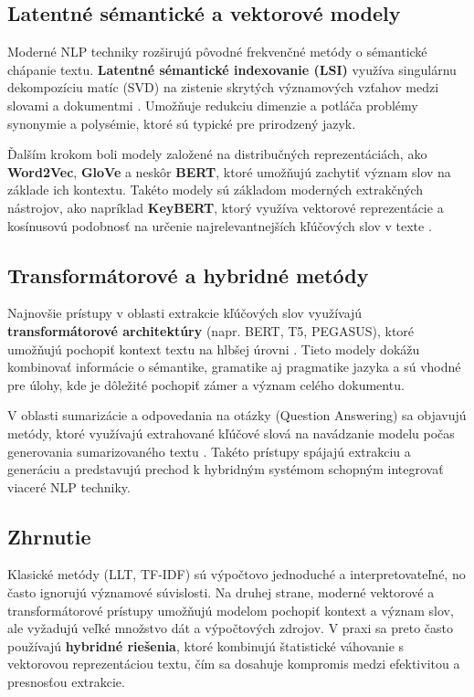 \documentclass[a4paper,12pt]{article}
\begin{document}
\subsection{Latentné sémantické a vektorové modely}

Moderné NLP techniky rozširujú pôvodné frekvenčné metódy o sémantické chápanie textu. \textbf{Latentné sémantické indexovanie (LSI)} využíva singulárnu dekompozíciu matíc (SVD) na zistenie skrytých významových vzťahov medzi slovami a dokumentmi \cite{deerwester1990indexing}. Umožňuje redukciu dimenzie a potláča problémy synonymie a polysémie, ktoré sú typické pre prirodzený jazyk.

Ďalším krokom boli modely založené na distribučných reprezentáciách, ako \textbf{Word2Vec}, \textbf{GloVe} a neskôr \textbf{BERT}, ktoré umožňujú zachytiť význam slov na základe ich kontextu. Takéto modely sú základom moderných extrakčných nástrojov, ako napríklad \textbf{KeyBERT}, ktorý využíva vektorové reprezentácie a kosínusovú podobnosť na určenie najrelevantnejších kľúčových slov v texte \cite{grootendorst2020keybert}.

\subsection{Transformátorové a hybridné metódy}

Najnovšie prístupy v oblasti extrakcie kľúčových slov využívajú \textbf{transformátorové architektúry} (napr. BERT, T5, PEGASUS), ktoré umožňujú pochopiť kontext textu na hlbšej úrovni \cite{devlin2019bert, lewis2020bart, zhang2020pegasus}. Tieto modely dokážu kombinovať informácie o sémantike, gramatike aj pragmatike jazyka a sú vhodné pre úlohy, kde je dôležité pochopiť zámer a význam celého dokumentu.

V oblasti sumarizácie a odpovedania na otázky (Question Answering) sa objavujú metódy, ktoré využívajú extrahované kľúčové slová na navádzanie modelu počas generovania sumarizovaného textu \cite{grootendorst2020keybert}. Takéto prístupy spájajú extrakciu a generáciu a predstavujú prechod k hybridným systémom schopným integrovať viaceré NLP techniky.

\subsection{Zhrnutie}

Klasické metódy (LLT, TF-IDF) sú výpočtovo jednoduché a interpretovateľné, no často ignorujú významové súvislosti. Na druhej strane, moderné vektorové a transformátorové prístupy umožňujú modelom pochopiť kontext a význam slov, ale vyžadujú veľké množstvo dát a výpočtových zdrojov. V praxi sa preto často používajú \textbf{hybridné riešenia}, ktoré kombinujú štatistické váhovanie s vektorovou reprezentáciou textu, čím sa dosahuje kompromis medzi efektivitou a presnosťou extrakcie.
\end{document}
